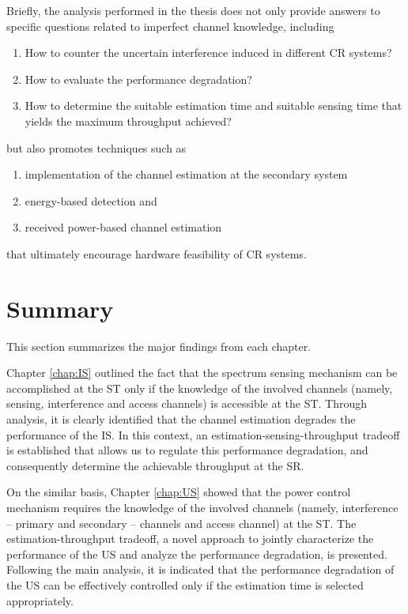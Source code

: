 Briefly, the analysis performed in the thesis does not only provide answers to specific questions related to imperfect channel knowledge, including 
\begin{enumerate} \item How to counter the uncertain interference induced in different CR systems? \item How to evaluate the performance degradation? \item How to determine the suitable estimation time and suitable sensing time that yields the maximum throughput achieved? \end{enumerate}
but also promotes techniques such as \begin{enumerate} \item implementation of the channel estimation at the secondary system \item energy-based detection and \item received power-based channel estimation \end{enumerate} that ultimately encourage hardware feasibility of CR systems. 


\section{Summary}
This section summarizes the major findings from each chapter. 

Chapter \ref{chap:IS} outlined the fact that the spectrum sensing mechanism can be accomplished at the ST only if the knowledge of the involved channels (namely, sensing, interference and access channels) is accessible at the ST. Through analysis, it is clearly identified that the channel estimation degrades the performance of the IS. In this context, an estimation-sensing-throughput tradeoff is established that allows us to regulate this performance degradation, and consequently determine the achievable throughput at the SR.

On the similar basis, Chapter \ref{chap:US} showed that the power control mechanism requires the knowledge of the involved channels (namely, interference -- primary and secondary -- channels and access channel) at the ST. The estimation-throughput tradeoff, a novel approach to jointly characterize the performance of the US and analyze the performance degradation, is presented. Following the main analysis, it is indicated that the performance degradation of the US can be effectively controlled only if the estimation time is selected appropriately.   

